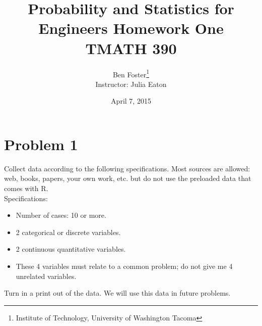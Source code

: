 \documentclass{article}
\begin{document}
{
	\title{Probability and Statistics for Engineers Homework One \\ TMATH 390}
	\author{Ben Foster\thanks{
		Institute of Technology, University of Washington Tacoma} \\
		Instructor: Julia Eaton }
	\date{April 7, 2015}
	\maketitle
	\thispagestyle{empty} %
	\clearpage
	
	
	\tableofcontents
	\clearpage
	\setcounter{page}{1}
}

\section*{Problem 1}

	Collect data according to the following specifications. Most sources are allowed: web, books,
	papers, your own work, etc. but do not use the preloaded data that comes with R. \\
	
	\noindent Specifications:
	\begin{itemize}
		\item{Number of cases: 10 or more.}
		\item{2 categorical or discrete variables.}
		\item{2 continuous quantitative variables.}
		\item{These 4 variables must relate to a common problem; do not give me 4 unrelated
		variables.}
	\end{itemize}
	
	\noindent Turn in a print out of the data. We will use this data in future problems.
	
\end{document}
